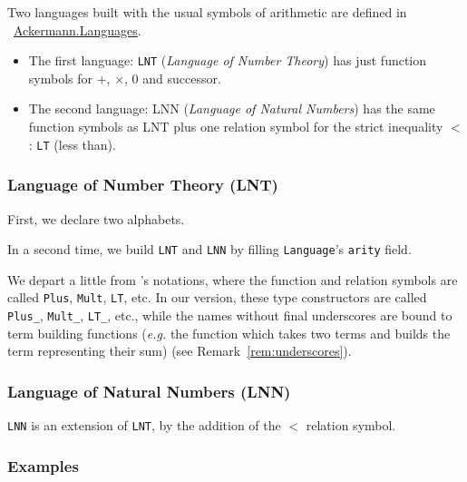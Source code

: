 Two languages built with the usual symbols of arithmetic are 
defined in ~\href{../theories/html/hydras.Ackermann.Languages.html}{Ackermann.Languages}.

\begin{itemize}
\item The first language: \texttt{LNT} (\emph{Language of Number Theory}) has just function symbols for $+$, $\times$, $0$ and successor.
\item The second language: LNN (\emph{Language of Natural Numbers})  has
the same function symbols as LNT plus one relation symbol for the strict inequality $<$ : \texttt{LT} (less than).
\end{itemize}

\subsubsection{Language of Number Theory (LNT)}

First, we declare two alphabets.


In a second time, we build \texttt{LNT} and \texttt{LNN} by filling \texttt{Language}'s \texttt{arity} field.


\begin{remark}
  We depart a little from \cite{Goedel}'s notations, where the 
function and relation symbols are called \texttt{Plus}, 
\texttt{Mult}, \texttt{LT}, etc. In our version, these type constructors are called \texttt{Plus\_}, 
\texttt{Mult\_}, \texttt{LT\_}, etc., while the names without final underscores are bound to term building functions (\emph{e.g.}
the function which takes two terms and builds the term representing their sum) (see Remark~\ref{rem:underscores}).
\end{remark}


\subsubsection{Language of Natural Numbers (LNN)}

\texttt{LNN} is an extension of \texttt{LNT}, by the addition 
of the $<$ relation symbol.





\subsubsection{Examples}

